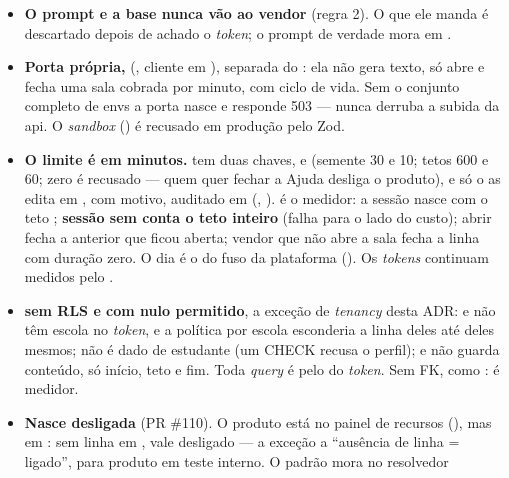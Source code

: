\begin{itemize}
    e não fechou ( nulo). \emph{Token} na fala da pessoa
    não vale: só o  é lido.
  \item \textbf{O prompt e a base nunca vão ao vendor} (regra 2). O 
    que ele manda é descartado depois de achado o \emph{token}; o prompt de
    verdade mora em .
  \item \textbf{Porta própria, }
    (, cliente em
    ), separada do : ela não gera
    texto, só abre e fecha uma sala cobrada por minuto, com ciclo de vida. Sem
    o conjunto completo de envs a porta nasce  e
     responde 503 --- nunca derruba a subida da api. O
    \emph{sandbox} () é recusado em produção pelo Zod.
  \item \textbf{O limite é em minutos.}  tem duas chaves,
     e  (semente 30 e 10; tetos 600
    e 60; zero é recusado --- quem quer fechar a Ajuda desliga o produto), e só
    o  as edita em , com motivo, auditado
    em  (, ).
     é o medidor: a sessão nasce com o teto
    ; \textbf{sessão sem
     conta o teto inteiro} (falha para o lado do custo); abrir fecha a
    anterior que ficou aberta; vendor que não abre a sala fecha a linha com
    duração zero. O dia é o do fuso da plataforma (). Os
    \emph{tokens} continuam medidos pelo .
  \item \textbf{ sem RLS e com  nulo
    permitido}, a exceção de \emph{tenancy} desta ADR:  e
     não têm escola no \emph{token}, e a política por escola
    esconderia a linha deles até deles mesmos; não é dado de estudante (um
    CHECK recusa o perfil); e não guarda conteúdo, só início, teto e fim. Toda
    \emph{query} é pelo  do \emph{token}. Sem FK, como
    : é medidor.
  \item \textbf{Nasce desligada} (PR \#110). O produto  está no
    painel de recursos (), mas em
    : sem linha em
    , vale desligado --- a exceção a \enquote{ausência de
    linha = ligado}, para produto em teste interno. O padrão mora no resolvedor

\end{itemize}
